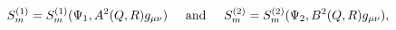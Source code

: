 \begin{equation}
S_m^{(1)} = S_m^{(1)}(\Psi_1,A^2(Q,R)g_{\mu\nu}) \hspace{0.5cm} {\rm and}
\hspace{0.5cm} S_m^{(2)} = S_m^{(2)}(\Psi_2,B^2(Q,R)g_{\mu\nu}),
\end{equation}

